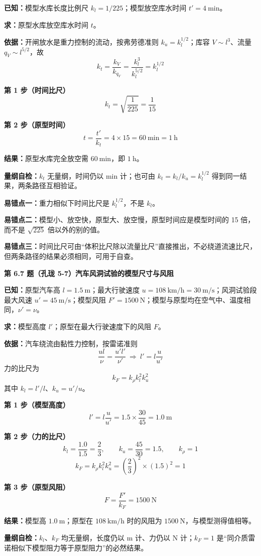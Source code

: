 \begin{jie}
\textbf{已知：}模型水库长度比例尺 $k_l=1/225$；模型放空库水时间 $t'=4\ \mathrm{min}$。

\textbf{求：}原型水库放空库水时间 $t$。

\textbf{依据：}开闸放水是重力控制的流动，按弗劳德准则 $k_u=k_l^{1/2}$；库容 $V\sim l^{3}$、流量 $q_V\sim l^{5/2}$，故
\[k_t=\frac{k_V}{k_{q_V}}=\frac{k_l^{3}}{k_l^{5/2}}=k_l^{1/2}\]

\textbf{第 1 步（时间比尺）}\quad
\[k_t=\sqrt{\frac{1}{225}}=\frac{1}{15}\]

\textbf{第 2 步（原型时间）}\quad
\[t=\frac{t'}{k_t}=4\times15=60\ \mathrm{min}=1\ \mathrm{h}\]

\textbf{结果：}原型水库完全放空需 $60\ \mathrm{min}$，即 $1\ \mathrm{h}$。

\textbf{量纲自检：}$k_t$ 无量纲，时间仍以 min 计；也可由 $k_t=k_l/k_u=k_l^{1/2}$ 得到同一结果，两条路径互相验证。
\end{jie}

\begin{yicuo}
\textbf{易错点一：}重力相似下时间比尺是 $k_l^{1/2}$，不是 $k_l$。

\textbf{易错点二：}模型小、放空快，原型大、放空慢，原型时间应是模型时间的 15 倍，而不是 $\sqrt{225}$ 倍以外的别的值。

\textbf{易错点三：}时间比尺可由“体积比尺除以流量比尺”直接推出，不必绕道流速比尺，但两条路径的结果必须相同，可用于自查。
\end{yicuo}

\noindent\textbf{第 6.7 题（孔珑 5-7）\quad 汽车风洞试验的模型尺寸与风阻}

\begin{jie}
\textbf{已知：}原型汽车高 $l=1.5\ \mathrm{m}$；最大行驶速度 $u=108\ \mathrm{km/h}=30\ \mathrm{m/s}$；风洞试验段最大风速 $u'=45\ \mathrm{m/s}$；模型风阻 $F'=1500\ \mathrm{N}$；模型与原型均在空气中、温度相同，$\nu'=\nu$。

\textbf{求：}模型高度 $l'$；原型在最大行驶速度下的风阻 $F$。

\textbf{依据：}汽车绕流由黏性力控制，按雷诺准则
\[\frac{ul}{\nu}=\frac{u'l'}{\nu'}\ \Longrightarrow\ l'=l\frac{u}{u'}\]
力的比尺为
\[k_F=k_\rho k_l^{2}k_u^{2}\]
其中 $k_l=l'/l$、$k_u=u'/u$。

\textbf{第 1 步（模型高度）}\quad
\[l'=l\frac{u}{u'}=1.5\times\frac{30}{45}=1.0\ \mathrm{m}\]

\textbf{第 2 步（力的比尺）}\quad
\[k_l=\frac{1.0}{1.5}=\frac{2}{3},\qquad k_u=\frac{45}{30}=1.5,\qquad k_\rho=1\]
\[k_F=k_\rho k_l^{2}k_u^{2}=\left(\frac{2}{3}\right)^{2}\times(1.5)^{2}=1\]

\textbf{第 3 步（原型风阻）}\quad
\[F=\frac{F'}{k_F}=1500\ \mathrm{N}\]

\textbf{结果：}模型高 $1.0\ \mathrm{m}$；原型在 $108\ \mathrm{km/h}$ 时的风阻为 $1500\ \mathrm{N}$，与模型测得值相等。

\textbf{量纲自检：}$k_l$、$k_F$ 均无量纲，长度仍以 $\mathrm{m}$ 计、力仍以 $\mathrm{N}$ 计；$k_F=1$ 是“同介质雷诺相似下模型阻力等于原型阻力”的必然结果。
\end{jie}

